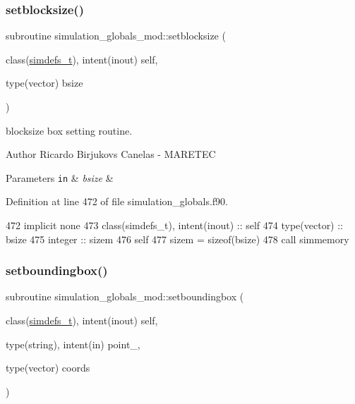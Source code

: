 \subsubsection{\texorpdfstring{setblocksize()}{setblocksize()}}
{\footnotesize\ttfamily subroutine simulation\+\_\+globals\+\_\+mod\+::setblocksize (\begin{DoxyParamCaption}\item[{class(\mbox{\hyperlink{structsimulation__globals__mod_1_1simdefs__t}{simdefs\+\_\+t}}), intent(inout)}]{self,  }\item[{type(vector)}]{bsize }\end{DoxyParamCaption})\hspace{0.3cm}{\ttfamily [private]}}



blocksize box setting routine. 

\begin{DoxyAuthor}{Author}
Ricardo Birjukovs Canelas -\/ M\+A\+R\+E\+T\+EC
\end{DoxyAuthor}

\begin{DoxyParams}[1]{Parameters}
\mbox{\tt in}  & {\em bsize} & \\
\hline
\end{DoxyParams}


Definition at line 472 of file simulation\+\_\+globals.\+f90.


\begin{DoxyCode}
472     \textcolor{keywordtype}{implicit none}
473     \textcolor{keywordtype}{class}(simdefs\_t), \textcolor{keywordtype}{intent(inout)} :: self
474     \textcolor{keywordtype}{type}(vector) :: bsize
475     \textcolor{keywordtype}{integer} :: sizem
476     self%
477     sizem = sizeof(bsize)
478     \textcolor{keyword}{call }simmemory%
\end{DoxyCode}
\mbox{\label{namespacesimulation__globals__mod_a412b0779703630189e2ea14e4b390864}} 
\subsubsection{\texorpdfstring{setboundingbox()}{setboundingbox()}}
{\footnotesize\ttfamily subroutine simulation\+\_\+globals\+\_\+mod\+::setboundingbox (\begin{DoxyParamCaption}\item[{class(\mbox{\hyperlink{structsimulation__globals__mod_1_1simdefs__t}{simdefs\+\_\+t}}), intent(inout)}]{self,  }\item[{type(string), intent(in)}]{point\+\_\+,  }\item[{type(vector)}]{coords }\end{DoxyParamCaption})\hspace{0.3cm}{\ttfamily [private]}}



